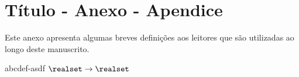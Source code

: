
\chapter{Título - Anexo - Apendice}

Este anexo apresenta algumas breves definições aos leitores que são
utilizadas ao longo deste manuscrito. 

abcdef-asdf $\realset\rightarrow\realset$
